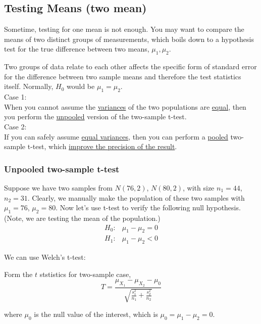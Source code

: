 \documentclass[12pt]{article}
\begin{document}
\subsection{Testing Means (two mean)}


Sometime, testing for one mean is not enough. You may want to compare
the means of two distinct groups of measurements, which boils down
to a hypothesis test for the true difference between two means, 
$ \mu_1, \mu_2 $.


Two groups of data relate to each other affects the specific form of
standard error for the difference between two sample means and 
therefore the test statistics itself. 
Normally, $ H_0 $ would be $ \mu_1 = \mu_2 $.\\

Case 1:\\
When you cannot assume the {\underline {variances}} of the two 
populations are {\underline {equal}}, then you perform the 
{\underline {unpooled}} version of the two-sample t-test.\\

Case 2:\\
If you can safely assume {\underline {equal variances}}, then you
can perform a {\underline {pooled}} two-sample t-test, which
{\underline {improve the precision of the result}}.



\subsubsection{Unpooled two-sample t-test}

Suppose we have two samples from $ N(76, 2) $, $ N(80, 2) $, with size
$ n_1 = 44 $, $ n_2 = 31 $. Clearly, we manually make the population
of these two samples
with $ \mu_1 = 76 $, $ \mu_2 = 80 $. Now let's use t-test to verify
the following null hypothesis. (Note, we are testing the mean of the
population.)
\begin{align*}
H_0:& \mu_1 - \mu_2 = 0\\
H_1:& \mu_1 - \mu_2 < 0
\end{align*}


We can use Welch's t-test:

Form the $ t $ ststistics for two-sample case,
\begin{equation*}
T = \frac{\mu_{X_1} - \mu_{X_2} - \mu_0}{\sqrt {
		\frac{s_1^{2}}{n_1} + \frac{s_2^{2}}{n_2}
}}
\end{equation*}

where $ \mu_0 $ is the null value of the interest, which is
$ \mu_0 = \mu_1 - \mu_2 = 0 $.
\end{document}
